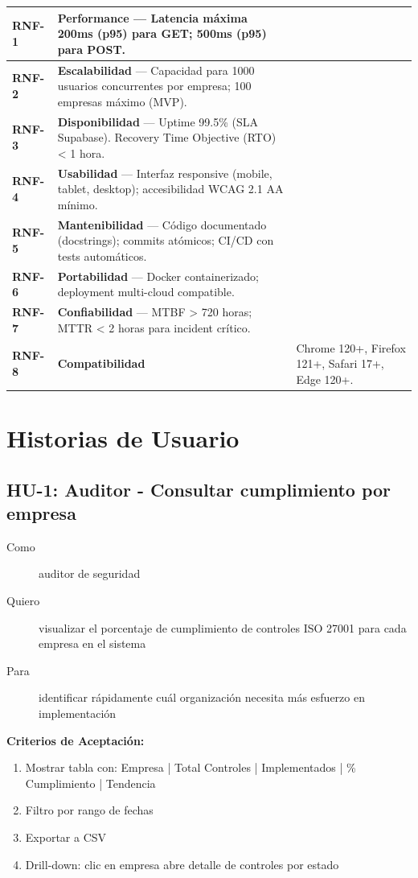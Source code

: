 \documentclass[12pt,a4paper,oneside]{article}
\begin{document}
\begin{tabularx}{\linewidth}{|l|X|}
\hline
\textbf{RNF-1} & \textbf{Performance} --- Latencia máxima 200ms (p95) para GET; 500ms (p95) para POST. \\
\hline
\textbf{RNF-2} & \textbf{Escalabilidad} --- Capacidad para 1000 usuarios concurrentes por empresa; 100 empresas máximo (MVP). \\
\hline
\textbf{RNF-3} & \textbf{Disponibilidad} --- Uptime 99.5\% (SLA Supabase). Recovery Time Objective (RTO) \textless{} 1 hora. \\
\hline
\textbf{RNF-4} & \textbf{Usabilidad} --- Interfaz responsive (mobile, tablet, desktop); accesibilidad WCAG 2.1 AA mínimo. \\
\hline
\textbf{RNF-5} & \textbf{Mantenibilidad} --- Código documentado (docstrings); commits atómicos; CI/CD con tests automáticos. \\
\hline
\textbf{RNF-6} & \textbf{Portabilidad} --- Docker containerizado; deployment multi-cloud compatible. \\
\hline
\textbf{RNF-7} & \textbf{Confiabilidad} --- MTBF \textgreater{} 720 horas; MTTR \textless{} 2 horas para incident crítico. \\
\hline
\textbf{RNF-8} & \textbf{Compatibilidad} & Chrome 120+, Firefox 121+, Safari 17+, Edge 120+. \\
\hline
\end{tabularx}

\section{Historias de Usuario}

\subsection{HU-1: Auditor - Consultar cumplimiento por empresa}

\begin{description}
  \item[Como] auditor de seguridad
  \item[Quiero] visualizar el porcentaje de cumplimiento de controles ISO 27001 para cada empresa en el sistema
  \item[Para] identificar rápidamente cuál organización necesita más esfuerzo en implementación
\end{description}

\textbf{Criterios de Aceptación:}
\begin{enumerate}
  \item Mostrar tabla con: Empresa | Total Controles | Implementados | \% Cumplimiento | Tendencia
  \item Filtro por rango de fechas
  \item Exportar a CSV
  \item Drill-down: clic en empresa abre detalle de controles por estado
\end{enumerate}
\end{document}
